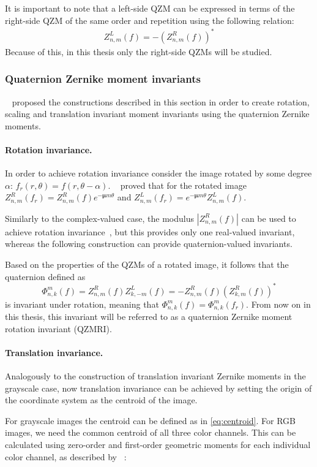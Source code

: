 It is important to note that a left-side QZM can be expressed in terms of the right-side QZM of the same order and repetition using the following relation:
\begin{gather*}
    Z_{n,m}^L(f) = -(Z_{n,m}^R(f))^{*}
\end{gather*}
Because of this, in this thesis only the right-side QZMs will be studied.

\subsubsection{Quaternion Zernike moment invariants}
\citeauthor{qzmi}~\cite{qzm, qzmi} proposed the constructions described in this section in order to create rotation, scaling and translation invariant moment invariants using the quaternion Zernike moments.

\paragraph{Rotation invariance.}
In order to achieve rotation invariance consider the image rotated by some degree $\alpha$: $f_{r}(r,\theta) = f(r, \theta - \alpha)$. \citeauthor{qzmi}~\cite{qzmi} proved that for the rotated image $Z_{n,m}^R(f_{r}) = Z_{n,m}^R(f)e^{-\bm{\mu}m\theta}$ and $Z_{n,m}^L(f_{r}) = e^{-\bm{\mu}m\theta}Z_{n,m}^L(f)$. 


Similarly to the complex-valued case, the modulus $|Z_{n,m}^R(f)|$ can be used to achieve rotation invariance~\cite{qzm}, but this provides only one real-valued invariant, whereas the following construction can provide quaternion-valued invariants. 


Based on the properties of the QZMs of a rotated image, it follows that the quaternion defined as
$$\Phi_{n,k}^m(f) = Z_{n,m}^R(f)Z_{k,-m}^L(f) = -Z_{n,m}^R(f)(Z_{k,m}^R(f))^*$$
is invariant under rotation, meaning that $\Phi_{n,k}^m(f) = \Phi_{n,k}^m(f_{r})$.
From now on in this thesis, this invariant will be referred to as a quaternion Zernike moment rotation invariant (QZMRI).

\paragraph{Translation invariance.}
Analogously to the construction of translation invariant Zernike moments in the grayscale case, now translation invariance can be achieved by setting the origin of the coordinate system as the centroid of the image.


For grayscale images the centroid can be defined as in \eqref{eq:centroid}. For RGB images, we need the common centroid of all three color channels. This can be calculated using zero-order and first-order geometric moments for each individual color channel, as described by \citeauthor{affine_color}~\cite{affine_color}:

